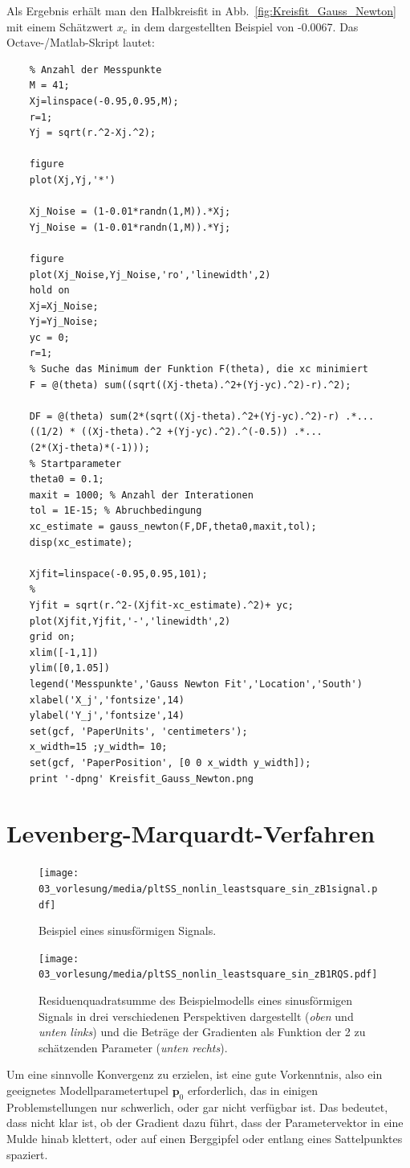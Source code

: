 Als Ergebnis erhält man den Halbkreisfit in Abb.~\ref*{fig:Kreisfit_Gauss_Newton} mit einem Schätzwert $x_c$ in dem dargestellten Beispiel von -0.0067.
Das Octave-/Matlab-Skript lautet:
\begin{verbatim}
	% Anzahl der Messpunkte
	M = 41;
	Xj=linspace(-0.95,0.95,M);
	r=1;
	Yj = sqrt(r.^2-Xj.^2);

	figure
	plot(Xj,Yj,'*')

	Xj_Noise = (1-0.01*randn(1,M)).*Xj;
	Yj_Noise = (1-0.01*randn(1,M)).*Yj;

	figure
	plot(Xj_Noise,Yj_Noise,'ro','linewidth',2)
	hold on
	Xj=Xj_Noise;
	Yj=Yj_Noise;
	yc = 0;
	r=1;
	% Suche das Minimum der Funktion F(theta), die xc minimiert
	F = @(theta) sum((sqrt((Xj-theta).^2+(Yj-yc).^2)-r).^2);

	DF = @(theta) sum(2*(sqrt((Xj-theta).^2+(Yj-yc).^2)-r) .*...
	((1/2) * ((Xj-theta).^2 +(Yj-yc).^2).^(-0.5)) .*...
	(2*(Xj-theta)*(-1)));
	% Startparameter
	theta0 = 0.1;
	maxit = 1000; % Anzahl der Interationen
	tol = 1E-15; % Abruchbedingung
	xc_estimate = gauss_newton(F,DF,theta0,maxit,tol);
	disp(xc_estimate);

	Xjfit=linspace(-0.95,0.95,101);
	%
	Yjfit = sqrt(r.^2-(Xjfit-xc_estimate).^2)+ yc;
	plot(Xjfit,Yjfit,'-','linewidth',2)
	grid on;
	xlim([-1,1])
	ylim([0,1.05])
	legend('Messpunkte','Gauss Newton Fit','Location','South')
	xlabel('X_j','fontsize',14)
	ylabel('Y_j','fontsize',14)
	set(gcf, 'PaperUnits', 'centimeters');
	x_width=15 ;y_width= 10;
	set(gcf, 'PaperPosition', [0 0 x_width y_width]);
	print '-dpng' Kreisfit_Gauss_Newton.png
\end{verbatim}

\newpage
\section{Levenberg-Marquardt-Verfahren}
\begin{figure}[htp]
\begin{center}
\texttt{[image: 03\_vorlesung/media/pltSS\_nonlin\_leastsquare\_sin\_zB1signal.pdf]}
\end{center}
\caption{Beispiel eines sinusförmigen Signals.\label{LSoptiExampleSinus}}
\end{figure}
\begin{figure}
\begin{center}
\texttt{[image: 03\_vorlesung/media/pltSS\_nonlin\_leastsquare\_sin\_zB1RQS.pdf]}
\end{center}
\caption{Residuenquadratsumme des Beispielmodells eines sinusförmigen Signals
in drei verschiedenen Perspektiven dargestellt (\textsl{oben} und \textsl{unten links})
 und die Beträge der
Gradienten als Funktion der 2 zu schätzenden Parameter (\textsl{unten rechts}).\label{LSoptiExample1SinusRQS}}
\end{figure}
Um eine sinnvolle Konvergenz zu erzielen, ist eine gute Vorkenntnis, also ein geeignetes
Modellparametertupel $\mathbf{p}_0$ erforderlich, das in einigen Problemstellungen
nur schwerlich, oder gar nicht verfügbar ist. Das bedeutet, dass nicht klar ist, ob
der Gradient dazu führt, dass der Parametervektor in eine Mulde hinab klettert, oder auf
einen Berggipfel oder entlang eines Sattelpunktes spaziert.

